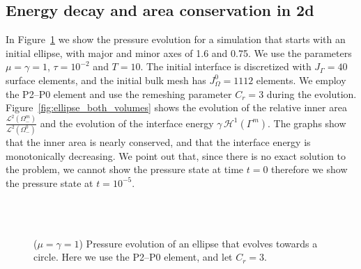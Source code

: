 \subsection{Energy decay and area conservation in 2d}
In Figure~\ref{fig:ellipse_both} we show the pressure evolution for a
simulation that starts with an initial ellipse, with major and minor axes of
1.6 and 0.75. We use the parameters $\mu = \gamma=1$, $\tau=10^{-2}$ and
$T=10$. The initial interface is discretized with $J_\Gamma = 40$ surface
elements, and the initial bulk mesh has $J_\Omega^0 = 1112$ elements. We employ
the P2--P0 element and use the remeshing parameter $C_r=3$ during the evolution.
Figure~\ref{fig:ellipse_both_volumes} shows the evolution of the relative inner
area $\frac{\mathcal{L}^2(\Omega^m_-)}{\mathcal{L}^2(\Omega^0_-)}$ and the
evolution of the interface energy $\gamma\,\mathcal{H}^{1}(\Gamma^m)$. The
graphs show that the inner area is nearly conserved, and that the interface
energy is monotonically decreasing. We point out that, since there is no exact
solution to the problem, we cannot show the pressure state at time $t=0$
therefore we show the pressure state at $t=10^{-5}$.
\begin{figure}[htbp]
\centering
{}\\
\\
\caption[Stokes ellipse pressure]
{($\mu=\gamma=1$) Pressure evolution of an ellipse that evolves towards a
circle. Here we use the P2--P0 element, and let $C_r = 3$.}
\label{fig:ellipse_both}
\end{figure}
